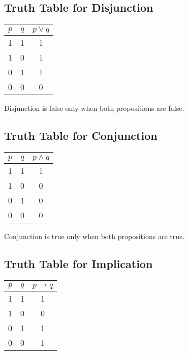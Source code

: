 \documentclass[12pt,a4paper,openany]{article}
\begin{document}
\subsection{Truth Table for Disjunction}\label{truth-table-for-disjunction}

\begin{center}
\begin{tabular}{|c|c|c|}
\hline
\(p\) & \(q\) & \(p \lor q\) \\
\hline
1 & 1 & 1 \\
1 & 0 & 1 \\
0 & 1 & 1 \\
0 & 0 & 0 \\
\hline
\end{tabular}
\end{center}

Disjunction is false only when both propositions are false.

\subsection{Truth Table for Conjunction}\label{truth-table-for-conjunction}

\begin{center}
\begin{tabular}{|c|c|c|}
\hline
\(p\) & \(q\) & \(p \land q\) \\
\hline
1 & 1 & 1 \\
1 & 0 & 0 \\
0 & 1 & 0 \\
0 & 0 & 0 \\
\hline
\end{tabular}
\end{center}

Conjunction is true only when both propositions are true.

\subsection{Truth Table for Implication}\label{truth-table-for-implication}

\begin{center}
\begin{tabular}{|c|c|c|}
\hline
\(p\) & \(q\) & \(p \rightarrow q\) \\
\hline
1 & 1 & 1 \\
1 & 0 & 0 \\
0 & 1 & 1 \\
0 & 0 & 1 \\
\hline
\end{tabular}
\end{center}
\end{document}
